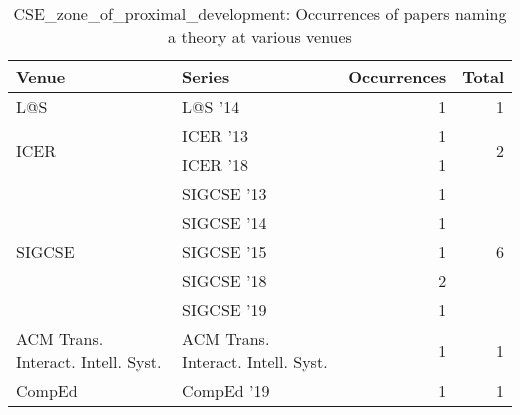 \begin{table*}[t]
\begin{tabular}{llrr}
Venue & Series & Occurrences & Total\\\hline
\multirow{1}{*}{L@S } & L@S '14 & 1 & \multirow{1}{*}{1}\\
\multirow{2}{*}{ICER } & ICER '13 & 1 & \multirow{2}{*}{2}\\
& ICER '18 & 1 &\\
\multirow{5}{*}{SIGCSE } & SIGCSE '13 & 1 & \multirow{5}{*}{6}\\
& SIGCSE '14 & 1 &\\
& SIGCSE '15 & 1 &\\
& SIGCSE '18 & 2 &\\
& SIGCSE '19 & 1 &\\
\multirow{1}{*}{ACM Trans. Interact. Intell. Syst.} & ACM Trans. Interact. Intell. Syst. & 1 & \multirow{1}{*}{1}\\
\multirow{1}{*}{CompEd } & CompEd '19 & 1 & \multirow{1}{*}{1}\\
\end{tabular}
\caption{CSE\_zone\_of\_proximal\_development: Occurrences of papers naming a theory at various venues}
\end{table*}